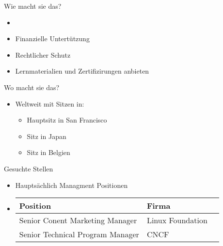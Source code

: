 \documentclass[11pt,aspectratio=169]{beamer}
\begin{document}
\begin{frame}{Wie macht sie das?}
	\begin{itemize}
		\item <1->
		\item <2->Finanzielle Untertützung
		\item <3->Rechtlicher Schutz
		\item <4->Lernmaterialien und Zertifizirungen anbieten\cite{Training}
	\end{itemize}
\end{frame}
\begin{frame}{Wo macht sie das?}
	\begin{itemize}
		\item Weltweit mit Sitzen in:
		      \begin{itemize}
			      \item Hauptsitz in San Francisco \cite{Locations}
			      \item Sitz in Japan\cite{Locations}
			      \item Sitz in Belgien\cite{Locations}
		      \end{itemize}
	\end{itemize}
\end{frame}
\begin{frame}{Gesuchte Stellen}
	\begin{itemize}

		\item	Hauptsächlich Managment Positionen\cite{Positionen}
		\item	\begin{tabularx}{0.5\textwidth} {
				      | >{\raggedright\arraybackslash}X
				      | >{\centering\arraybackslash}X
				      | >{\raggedleft\arraybackslash}X |}
			      \hline
			      Position                         & Firma            \\
			      \hline
			      Senior Conent Marketing Manager  & Linux Foundation \\
			      \hline
			      Senior Technical Program Manager & CNCF             \\
			      \hline
		      \end{tabularx}
	\end{itemize}
\end{frame}
\end{document}
